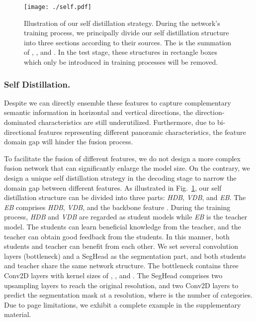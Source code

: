 \documentclass[runningheads]{llncs}
\begin{document}
	
	\begin{figure}[t]
		\centering
		\texttt{[image: ./self.pdf]}
		\caption{Illustration of our self distillation strategy.
			During the network's training process, we principally divide our self distillation structure into three sections according to their sources.
			The  is the summation of , , and .
			In the test stage, these structures in rectangle boxes which only be introduced in training processes will be removed.}
		\label{self distillation}
	\end{figure}
	
	
	\subsubsection{Self Distillation.}
	
	Despite we can directly ensemble these features to capture complementary semantic information in horizontal and vertical directions, the direction-dominated characteristics are still underutilized.
	Furthermore, due to bi-directional features representing different panoramic characteristics, the feature domain gap will hinder the fusion process.
	
To facilitate the fusion of different features, we do not design a more complex fusion network that can significantly enlarge the model size. On the contrary, we design a unique self distillation strategy in the decoding stage to narrow the domain gap between different features. As illustrated in Fig.~\ref{self distillation}, our self distillation structure can be divided into three parts: \emph{HDB}, \emph{VDB}, and \emph{EB}. 
	The \emph{EB} comprises \emph{HDB}, \emph{VDB}, and the backbone feature .
During the training process, \emph{HDB} and \emph{VDB} are regarded as student models while \emph{EB} is the teacher model. The students can learn beneficial knowledge from the teacher, and the teacher can obtain good feedback from the students. In this manner, both students and teacher can benefit from each other. 
	We set several convolution layers (bottleneck) and a SegHead as the segmentation part, and both students and teacher share the same network structure.
	The bottleneck contains three Conv2D layers with kernel sizes of , , and .
	The SegHead comprises two upsampling layers to reach the original resolution, and two Conv2D layers to predict the segmentation mask at a  resolution, where  is the number of categories. 
	Due to page limitations, we exhibit a complete example in the supplementary material.
	
\end{document}
